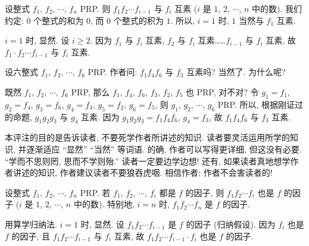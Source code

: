 \begin{proposition}
    设整式 $f_1$, $f_2$, $\cdots$, $f_n$ PRP. 则 $f_1 f_2 \cdots f_{i-1}$ 与 $f_i$ 互素 ($i$ 是 $1$, $2$, $\cdots$, $n$ 中的数). 我们约定: $0$ 个整式的和为 $0$, 而 $0$ 个整式的积为 $1$. 所以, $i = 1$ 时, $1$ 当然与 $f_1$ 互素.
\end{proposition}

\begin{pf}
    $i = 1$ 时, 显然. 设 $i \geq 2$. 因为 $f_1$ 与 $f_i$ 互素, $f_2$ 与 $f_i$ 互素……$f_{i-1}$ 与 $f_i$ 互素, 故 $f_1 \cdot f_2 \cdots f_{i-1}$ 与 $f_i$ 互素.
\end{pf}

\begin{remark}
    设六整式 $f_1$, $f_2$, $\cdots$, $f_6$ PRP. 作者问: $f_1 f_4 f_6$ 与 $f_3$ 互素吗? 当然了. 为什么呢?

    既然 $f_1$, $f_2$, $\cdots$, $f_6$ PRP, 那么 $f_1$, $f_4$, $f_6$, $f_3$, $f_2$, $f_5$ 也 PRP, 对不对? 令 $g_1 = f_1$, $g_2 = f_4$, $g_3 = f_6$, $g_4 = f_3$, $g_5 = f_2$, $g_6 = f_5$, 则 $g_1$, $g_2$, $\cdots$, $g_6$ PRP. 所以, 根据刚证过的命题, $g_1 g_2 g_3$ 与 $g_4$ 互素. 因为 $g_1 g_2 g_3 = f_1 f_4 f_6$, $g_4 = f_3$, 故 $f_1 f_4 f_6$ 与 $f_3$ 互素.

    本评注的目的是告诉读者, 不要死学作者所讲述的知识. 读者要灵活运用所学的知识, 并逐渐适应 ``显然'' ``当然'' 等词语. 的确, 作者可以写得更详细, 但这没有必要. ``学而不思则罔, 思而不学则殆.'' 读者一定要边学边想! 还有, 如果读者真地想学作者讲述的知识, 作者建议读者不要狼吞虎咽. 相信作者; 作者不会害读者的!
\end{remark}

\begin{proposition}
    设整式 $f_1$, $f_2$, $\cdots$, $f_n$ PRP. 若 $f_1$, $f_2$, $\cdots$, $f_i$ 都是 $f$ 的因子, 则 $f_1 f_2 \cdots f_i$ 也是 $f$ 的因子 ($i$ 是 $1$, $2$, $\cdots$, $n$ 中的数). 特别地, $i = n$ 时, $f_1 f_2 \cdots f_n$ 是 $f$ 的因子.
\end{proposition}

\begin{pf}
    用算学归纳法. $i = 1$ 时, 显然. 设 $f_1 f_2 \cdots f_{i-1}$ 是 $f$ 的因子 (归纳假设). 因为 $f_i$ 也是 $f$ 的因子, 且 $f_1 f_2 \cdots f_{i-1}$ 与 $f_i$ 互素, 故 $f_1 f_2 \cdots f_{i-1} \cdot f_i$ 也是 $f$ 的因子.
\end{pf}

\myLine


